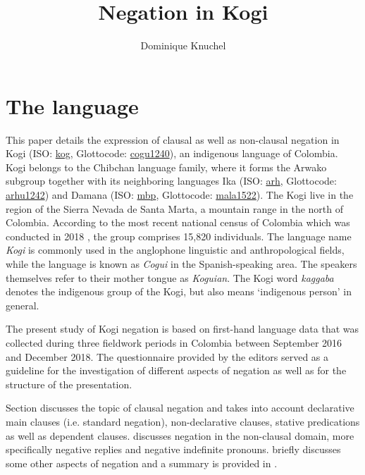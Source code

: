 \documentclass[output=paper,colorlinks,citecolor=brown]{langscibook}
\author{Dominique Knuchel}
\title{Negation in Kogi}
\begin{document}
\maketitle 
\section{The language}\label{sec:kog:1}

This paper details the expression of clausal as well as non-clausal negation in Kogi (ISO: \href{https://iso639-3.sil.org/code/kog}{kog}, Glottocode: \href{https://glottolog.org/resource/languoid/id/cogu1240}{cogu1240}), an indigenous language of Colombia. Kogi belongs to the Chibchan language family, where it forms the Arwako subgroup together with its neighboring languages Ika (ISO: \href{https://iso639-3.sil.org/code/arh}{arh}, Glottocode: \href{https://glottolog.org/resource/languoid/id/arhu1242}{arhu1242}) and Damana (ISO: \href{https://iso639-3.sil.org/code/mbp}{mbp}, Glottocode: \href{https://glottolog.org/resource/languoid/id/mala1522}{mala1522}). The Kogi live in the region of the Sierra Nevada de Santa Marta, a mountain range in the north of Colombia. According to the most recent national census of Colombia which was conducted in 2018 \citep{DANE2018}, the group comprises 15,820 individuals. The language name \textit{Kogi} is commonly used in the anglophone linguistic and anthropological fields, while the language is known as \textit{Cogui} in the Spanish-speaking area. The speakers themselves refer to their mother tongue as \textit{Koguian}. The Kogi word \textit{kaggaba} denotes the indigenous group of the Kogi, but also means ‘indigenous person’ in general.

The present study of Kogi negation is based on first-hand language data that was collected during three fieldwork periods in Colombia between September 2016 and December 2018. The questionnaire provided by the editors  served as a guideline for the investigation of different aspects of negation as well as for the structure of the presentation.

Section  discusses the topic of clausal negation and takes into account declarative main clauses (i.e. standard negation), non-declarative clauses, stative predications as well as dependent clauses.  discusses negation in the non-clausal domain, more specifically negative replies and negative indefinite pronouns.  briefly discusses some other aspects of negation and a summary is provided in .
\end{document}

